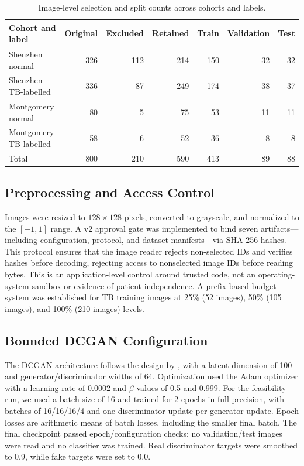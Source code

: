 \documentclass[11pt]{article}
\begin{document}
\begin{table}[ht]
\centering
\caption{Image-level selection and split counts across cohorts and labels.}
\label{tab:dataset_split}
\begin{tabular}{lrrrrrr}
\toprule
Cohort and label & Original & Excluded & Retained & Train & Validation & Test \\
\midrule
Shenzhen normal & 326 & 112 & 214 & 150 & 32 & 32 \\
Shenzhen TB-labelled & 336 & 87 & 249 & 174 & 38 & 37 \\
Montgomery normal & 80 & 5 & 75 & 53 & 11 & 11 \\
Montgomery TB-labelled & 58 & 6 & 52 & 36 & 8 & 8 \\
\midrule
Total & 800 & 210 & 590 & 413 & 89 & 88 \\
\bottomrule
\end{tabular}
\end{table}

\subsection{Preprocessing and Access Control}
Images were resized to $128 \times 128$ pixels, converted to grayscale, and normalized to the $[-1, 1]$ range. A v2 approval gate was implemented to bind seven artifacts—including configuration, protocol, and dataset manifests—via SHA-256 hashes. This protocol ensures that the image reader rejects non-selected IDs and verifies hashes before decoding, rejecting access to nonselected image IDs before reading bytes. This is an application-level control around trusted code, not an operating-system sandbox or evidence of patient independence. A prefix-based budget system was established for TB training images at 25\% (52 images), 50\% (105 images), and 100\% (210 images) levels.

\subsection{Bounded DCGAN Configuration}
The DCGAN architecture follows the design by \citet{radford2015}, with a latent dimension of 100 and generator/discriminator widths of 64. Optimization used the Adam optimizer with a learning rate of 0.0002 and $\beta$ values of 0.5 and 0.999. For the feasibility run, we used a batch size of 16 and trained for 2 epochs in full precision, with batches of 16/16/16/4 and one discriminator update per generator update. Epoch losses are arithmetic means of batch losses, including the smaller final batch. The final checkpoint passed epoch/configuration checks; no validation/test images were read and no classifier was trained. Real discriminator targets were smoothed to 0.9, while fake targets were set to 0.0.
\end{document}
